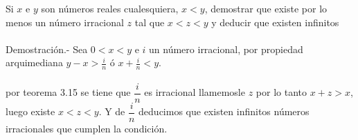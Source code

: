 \begin{teo}
Si $x$ e $y$ son números reales cualesquiera, $x<y$, demostrar que existe por lo menos un número irracional $z$ tal que $x<z<y$ y deducir que existen infinitos\\\\
Demostración.- \; Sea $0<x<y$ e $i$ un número irracional, por propiedad arquimediana  $y-x>\displaystyle\frac{i}{n}$ \; ó \; $\displaystyle x+ \frac{i}{n}<y$. \\\\
por teorema 3.15 \; se tiene que $\dfrac{i}{n}$ es irracional llamemosle $z$ por lo tanto  $x+z>x$, luego existe $x<z<y$. Y de $\dfrac{i}{n}$  deducimos que existen infinitos números irracionales que cumplen la condición.\\\\
\end{teo}

